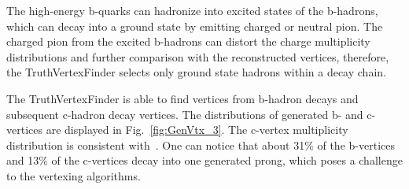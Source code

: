 The high-energy b-quarks can hadronize into excited states of the b-hadrons, which can decay into a ground state by emitting charged or neutral pion. 
The charged pion from the excited b-hadrons can distort the charge multiplicity distributions and further comparison with the reconstructed vertices, therefore, the TruthVertexFinder selects only ground state hadrons within a decay chain. 

The TruthVertexFinder is able to find vertices from b-hadron decays and subsequent c-hadron decay vertices. The distributions of generated b- and c-vertices are displayed in Fig.~\ref{fig:GenVtx_3}. The c-vertex multiplicity distribution is consistent with~\cite{bib:PDG}. One can notice that about 31\% of the b-vertices and 13\% of the c-vertices decay into one generated prong, which poses a challenge to the vertexing algorithms. 

